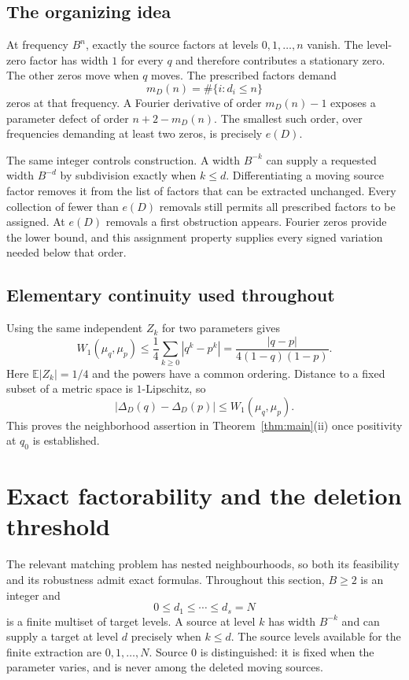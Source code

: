 \documentclass[11pt,letterpaper]{article}
\theoremstyle{definition}
\theoremstyle{remark}
\newcommand{\E}{\mathbb E}
\begin{document}
\subsection{The organizing idea}
At frequency $B^n$, exactly the source factors at levels $0,1,\ldots,n$ vanish. The level-zero factor has width $1$ for every $q$ and therefore contributes a stationary zero. The other zeros move when $q$ moves. The prescribed factors demand
\[
 m_D(n)=\#\{i:d_i\le n\}
\]
zeros at that frequency. A Fourier derivative of order $m_D(n)-1$ exposes a parameter defect of order $n+2-m_D(n)$. The smallest such order, over frequencies demanding at least two zeros, is precisely $e(D)$.

The same integer controls construction. A width $B^{-k}$ can supply a requested width $B^{-d}$ by subdivision exactly when $k\le d$. Differentiating a moving source factor removes it from the list of factors that can be extracted unchanged. Every collection of fewer than $e(D)$ removals still permits all prescribed factors to be assigned. At $e(D)$ removals a first obstruction appears. Fourier zeros provide the lower bound, and this assignment property supplies every signed variation needed below that order.

\subsection{Elementary continuity used throughout}
Using the same independent $Z_k$ for two parameters gives
\begin{equation}\label{eq:param-lipschitz}
 W_1(\mu_q,\mu_p)
 \le\frac14\sum_{k\ge0}|q^k-p^k|
 =\frac{|q-p|}{4(1-q)(1-p)}.
\end{equation}
Here $\E|Z_k|=1/4$ and the powers have a common ordering. Distance to a fixed subset of a metric space is $1$-Lipschitz, so
\[
 |\Delta_D(q)-\Delta_D(p)|\le W_1(\mu_q,\mu_p).
\]
This proves the neighborhood assertion in Theorem~\ref{thm:main}(ii) once positivity at $q_0$ is established.


\section{Exact factorability and the deletion threshold}
\label{hall:section}

The relevant matching problem has nested neighbourhoods, so both its
feasibility and its robustness admit exact formulas.  Throughout this
section, $B\ge2$ is an integer and
\[
  0\le d_1\le\cdots\le d_s=N
\]
is a finite multiset of target levels.  A source at level $k$ has width
$B^{-k}$ and can supply a target at level $d$ precisely when $k\le d$.
The source levels available for the finite extraction are $0,1,\ldots,N$.
Source $0$ is distinguished: it is fixed when the parameter varies,
and is never among the deleted moving sources.
\end{document}
